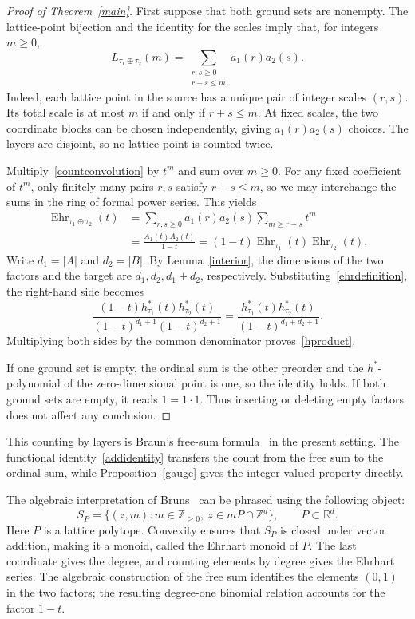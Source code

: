 \documentclass[11pt,reqno]{amsart}
\numberwithin{equation}{section}
\theoremstyle{definition}
\theoremstyle{remark}
\theoremstyle{definition}
\DeclareMathOperator{\Ehr}{Ehr}
\begin{document}
\begin{proof}[Proof of Theorem~\ref{main}]
First suppose that both ground sets are nonempty. The lattice-point bijection and the identity for the scales imply that, for integers $m\ge0$,
\begin{equation}\label{countconvolution}
L_{\tau_1\oplus\tau_2}(m)
 =\sum_{\substack{r,s\ge0\\r+s\le m}}a_1(r)a_2(s).
\end{equation}
Indeed, each lattice point in the source has a unique pair of integer scales $(r,s)$. Its total scale is at most $m$ if and only if $r+s\le m$. At fixed scales, the two coordinate blocks can be chosen independently, giving $a_1(r)a_2(s)$ choices. The layers are disjoint, so no lattice point is counted twice.

Multiply~\eqref{countconvolution} by $t^m$ and sum over $m\ge0$. For any fixed coefficient of $t^m$, only finitely many pairs $r,s$ satisfy $r+s\le m$, so we may interchange the sums in the ring of formal power series. This yields
\begin{align*}
\Ehr_{\tau_1\oplus\tau_2}(t)
 &=\sum_{r,s\ge0}a_1(r)a_2(s)\sum_{m\ge r+s}t^m\\
 &=\frac{A_1(t)A_2(t)}{1-t}
 =(1-t)\Ehr_{\tau_1}(t)\Ehr_{\tau_2}(t).
\end{align*}
Write $d_1=|A|$ and $d_2=|B|$. By Lemma~\ref{interior}, the dimensions of the two factors and the target are $d_1,d_2,d_1+d_2$, respectively. Substituting~\eqref{ehrdefinition}, the right-hand side becomes
\[
\frac{(1-t)h_{\tau_1}^*(t)h_{\tau_2}^*(t)}
 {(1-t)^{d_1+1}(1-t)^{d_2+1}}
 =\frac{h_{\tau_1}^*(t)h_{\tau_2}^*(t)}{(1-t)^{d_1+d_2+1}}.
\]
Multiplying both sides by the common denominator proves~\eqref{hproduct}.

If one ground set is empty, the ordinal sum is the other preorder and the $h^*$-polynomial of the zero-dimensional point is one, so the identity holds. If both ground sets are empty, it reads $1=1\cdot1$. Thus inserting or deleting empty factors does not affect any conclusion.
\end{proof}

This counting by layers is Braun's free-sum formula~\cite[Theorem~1]{BRAUN} in the present setting. The functional identity~\eqref{addidentity} transfers the count from the free sum to the ordinal sum, while Proposition~\ref{gauge} gives the integer-valued property directly.

The algebraic interpretation of Bruns~\cite[Section~1]{BRUNS} can be phrased using the following object:
\[
 S_P=\{(z,m):m\in\mathbb Z_{\ge0},\ z\in mP\cap\mathbb Z^d\},
 \qquad P\subset\mathbb R^d.
\]
Here $P$ is a lattice polytope. Convexity ensures that $S_P$ is closed under vector addition, making it a monoid, called the Ehrhart monoid of $P$. The last coordinate gives the degree, and counting elements by degree gives the Ehrhart series. The algebraic construction of the free sum identifies the elements $(0,1)$ in the two factors; the resulting degree-one binomial relation accounts for the factor $1-t$.
\end{document}
